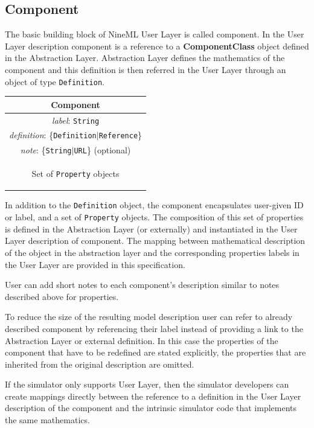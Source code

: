 \documentclass{article}
\newcommand{\ComponentClass}{{\bf{ComponentClass}}\xspace}
\begin{document}
\subsection{Component}

The basic building block of NineML User Layer is called component. In the
User Layer description component is a reference to a \ComponentClass
object defined in the Abstraction Layer. Abstraction Layer defines the
mathematics of the component and this definition is then referred in the
User Layer through an object of type {\tt Definition}.

\begin{table}[htb]
\center
\begin{tabular}{|c|}
\hline
\hline
Component \\
\hline
\hline
{\em label}: {\tt String} \\
\hline
{\em definition}: \{{\tt Definition}$|${\tt Reference}\}\\
\hline
{\em note}: \{{\tt String}$|${\tt URL}\} (optional)\\
\hline
\colorbox{issuecolor}{\parbox{0.4\linewidth}
{\center Set of {\tt Property} objects}} \\
\hline
\end{tabular}
\end{table}

In addition to the {\tt Definition} object, the component encapsulates
user-given ID or label, and a set of {\tt Property} objects. The composition
of this set of properties is defined in the Abstraction Layer (or externally)
and instantiated in the User Layer description of component. The mapping
between mathematical description of the object in the abstraction
layer and the corresponding properties labels in the User Layer are
provided in this specification.

User can add short notes to each component's description similar to
notes described above for properties.

To reduce the size of the resulting model description user can refer to
already described component by referencing their label instead of providing
a link to the Abstraction Layer or external definition. In this case the
properties of the component that have to be redefined are stated explicitly,
the properties that are inherited from the original description are omitted.

If the simulator only supports User Layer, then the simulator developers
can create mappings directly between the reference to a definition in the
User Layer description of the component and the intrinsic simulator code
that implements the same mathematics.
\end{document}
